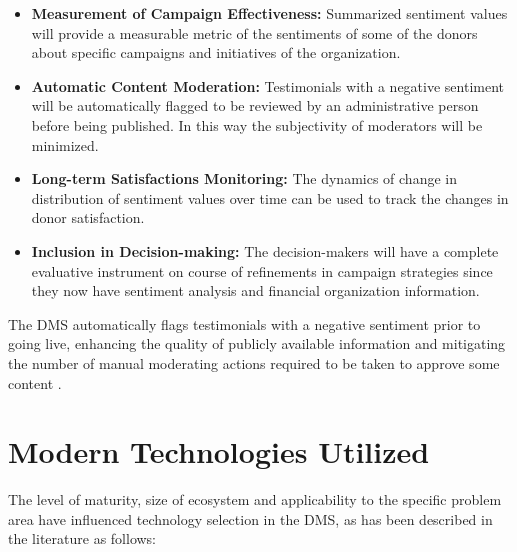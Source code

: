 \documentclass{thesis-library}
\begin{document}
\begin{itemize}
    \item \textbf{Measurement of Campaign Effectiveness:} Summarized sentiment values will provide a measurable metric of the sentiments of some of the donors about specific campaigns and initiatives of the organization.
    \item \textbf{Automatic Content Moderation:} Testimonials with a negative sentiment will be automatically flagged to be reviewed by an administrative person before being published. In this way the subjectivity of moderators will be minimized.
    \item \textbf{Long-term Satisfactions Monitoring:} The dynamics of change in distribution of sentiment values over time can be used to track the changes in donor satisfaction.
    \item \textbf{Inclusion in Decision-making:} The decision-makers will have a complete evaluative instrument on course of refinements in campaign strategies since they now have sentiment analysis and financial organization information.
\end{itemize}

The DMS automatically flags testimonials with a negative sentiment prior to going live, enhancing the quality of publicly available information and mitigating the number of manual moderating actions required to be taken to approve some content \cite{wang2021enhancing}.

\section{Modern Technologies Utilized}

The level of maturity, size of ecosystem and applicability to the specific problem area have influenced technology selection in the DMS, as has been described in the literature as follows:
\end{document}
